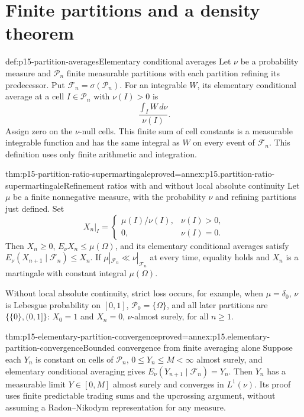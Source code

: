 \section{Finite partitions and a density theorem}

\begin{hbdefinition}{def:p15-partition-averages}{Elementary conditional averages}
Let \(\nu\) be a probability measure and
\(\mathcal P_n\) finite measurable partitions with each partition
refining its predecessor. Put \(\mathcal F_n=\sigma(\mathcal P_n)\).
For an integrable \(W\), its elementary conditional average at a
cell \(I\in\mathcal P_n\) with \(\nu(I)>0\) is
\[
                         \frac{\int_I W\,d\nu}{\nu(I)}.
\]
Assign zero on the \(\nu\)-null cells.
This finite sum of cell constants is a measurable integrable function
and has the same integral as \(W\) on every event of \(\mathcal F_n\).
This definition uses only finite arithmetic and integration.
\end{hbdefinition}

\begin{hbtheorem}{thm:p15-partition-ratio-supermartingale}{proved=annex:p15.partition-ratio-supermartingale}{Refinement ratios with and without local absolute continuity}
Let \(\mu\) be a finite nonnegative measure, with the probability
\(\nu\) and refining partitions just defined. Set
\[
 X_n|_I=
 \begin{cases}\mu(I)/\nu(I),&\nu(I)>0,\\0,&\nu(I)=0.\end{cases}
\]
Then \(X_n\geq0\), \(E_\nu X_n\leq\mu(\Omega)\), and its elementary
conditional averages satisfy
\(E_\nu(X_{n+1}\mid\mathcal F_n)\leq X_n\).
If \(\mu|_{\mathcal F_n}\ll\nu|_{\mathcal F_n}\) at every time,
equality holds and \(X_n\) is a martingale with constant integral
\(\mu(\Omega)\).

Without local absolute continuity, strict loss occurs, for example,
when \(\mu=\delta_0\), \(\nu\) is Lebesgue probability on \([0,1]\),
\(\mathcal P_0=\{\Omega\}\), and all later partitions are
\(\{\{0\},(0,1]\}\): \(X_0=1\) and \(X_n=0\), \(\nu\)-almost surely,
for all \(n\geq1\).
\end{hbtheorem}

\begin{hblemma}{thm:p15-elementary-partition-convergence}{proved=annex:p15.elementary-partition-convergence}{Bounded convergence from finite averaging alone}
Suppose each \(Y_n\) is constant on cells of \(\mathcal P_n\),
\(0\leq Y_n\leq M<\infty\) almost surely, and elementary conditional
averaging gives \(E_\nu(Y_{n+1}\mid\mathcal F_n)=Y_n\).
Then \(Y_n\) has a measurable limit \(Y\in[0,M]\) almost surely
and converges in \(L^1(\nu)\). Its proof uses finite predictable
trading sums and the upcrossing argument, without assuming a
Radon--Nikodym representation for any measure.
\end{hblemma}

